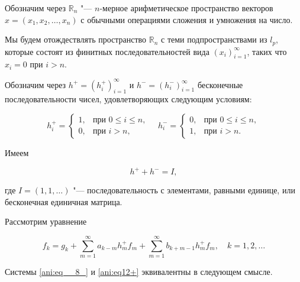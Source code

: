 Обозначим через $\mathbb R_{n} $ "--- $ n $-мерное арифметическое пространство векторов  $ x=\left(x_{1} ,  x_{2} , \dots , x_{n} \right) $ с обычными операциями сложения и умножения на число.



Мы будем отождествлять пространство $\mathbb  R_{n} $ с теми подпространствами из $l_{p} $, которые состоят из финитных последовательностей вида  $\left(x_{i} \right)_{i=1}^{\infty }$, таких что $ x_{i} =0$ при $i>n$.



Обозначим через $h^{+} =\left(h_{i}^{+} \right)_{i=1}^{\infty } $ и $h^{-} =\left(h_{i}^{-} \right)_{i=1}^{\infty } $ бесконечные последовательности чисел, удовлетворяющих следующим условиям:

\[h_{i}^{+} =\left\{

\begin{array}{ll} 1, & \mbox{при } 0\le i\le n , \\ 

0, &  \mbox{при }  i>n  , 

\end{array}\right.   

\quad 

  h_{i}^{-} =\left\{\begin{array}{ll}

 0, & \mbox{при }  0\le  i\le n,\\

 1, & \mbox{при }  i>n  .

 \end{array}\right. \]



Имеем

\[h^{+} +h^{-} =I, \]

где $I=\left(1, 1, \dots \right)$ "---  последовательность с элементами, равными единице, или бесконечная единичная матрица.



Рассмотрим уравнение

\begin{equation} 

\label{ani:eq12+} 

f_{k} =g_{k} +\sum\limits _{m=1}^{\infty }a_{k-m} h_{m}^{+} f_{m}  +\sum\limits _{m=1}^{\infty }b_{k+m-1} h_{m}^{+} f_{m}  , \quad  k=1, 2, \dots 

\end{equation}



Системы \eqref{ani:eq__8_} и \eqref{ani:eq12+} эквивалентны в следующем смысле. 


